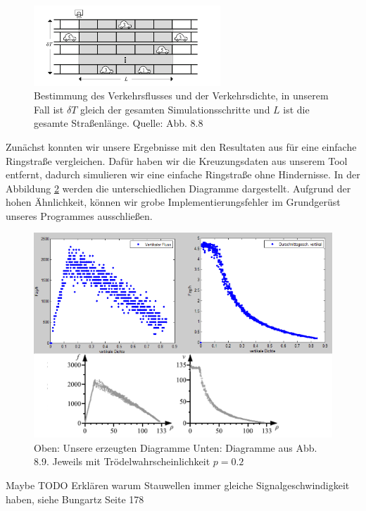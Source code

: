 \begin{figure}%
\centering
\includegraphics[width=7cm]{4_BestFD.png}%
\caption{Bestimmung des Verkehrsflusses und der Verkehrsdichte, in unserem Fall ist $\delta T$ gleich der gesamten Simulationsschritte und $L$ ist die gesamte Straßenlänge. Quelle: \cite{book:bungartz} Abb. 8.8}%
\label{pic:FD_Skizze}%
\end{figure}

Zunächst konnten wir unsere Ergebnisse mit den Resultaten aus \cite{book:bungartz} für eine einfache Ringstraße vergleichen. Dafür haben wir die Kreuzungsdaten aus unserem Tool entfernt, dadurch simulieren wir eine einfache Ringstraße ohne Hindernisse. In der Abbildung \ref{pic:FD_Vergleich} werden die unterschiedlichen Diagramme dargestellt. Aufgrund der hohen Ähnlichkeit, können wir grobe Implementierungsfehler im Grundgerüst unseres Programmes ausschließen.

\begin{figure}%
\centering
\includegraphics[width=12cm]{4_FD_Vergleich.png}%
\caption{Oben: Unsere erzeugten Diagramme Unten: Diagramme aus \cite{book:bungartz} Abb. 8.9. Jeweils mit Trödelwahrscheinlichkeit $p=0.2$}%
\label{pic:FD_Vergleich}%
\end{figure}





Maybe TODO Erklären warum Stauwellen immer gleiche Signalgeschwindigkeit haben, siehe Bungartz Seite 178

